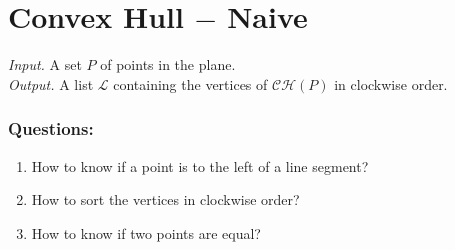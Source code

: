 \documentclass[twoside,12pt, a4paper]{memoir}
\begin{document}
\section{Convex Hull $-$ Naive}

\begin{algorithm}
\caption{$ConvexHullNaive(P)$}
\textit{Input.} A set $P$ of points in the plane. \\
\textit{Output.} A list $\mathcal{L}$ containing the vertices of $\mathcal{CH}(P)$ in clockwise order.
\begin{algorithmic}[1]
            \EndIf{}
        \EndFor{}
        \EndIf{}
    \EndFor{}
\end{algorithmic}
\end{algorithm}

\subsubsection{Questions:}
\begin{enumerate}
  \item How to know if a point is to the left of a line segment?
  \item How to sort the vertices in clockwise order?
  \item How to know if two points are equal?
\end{enumerate}
\end{document}
